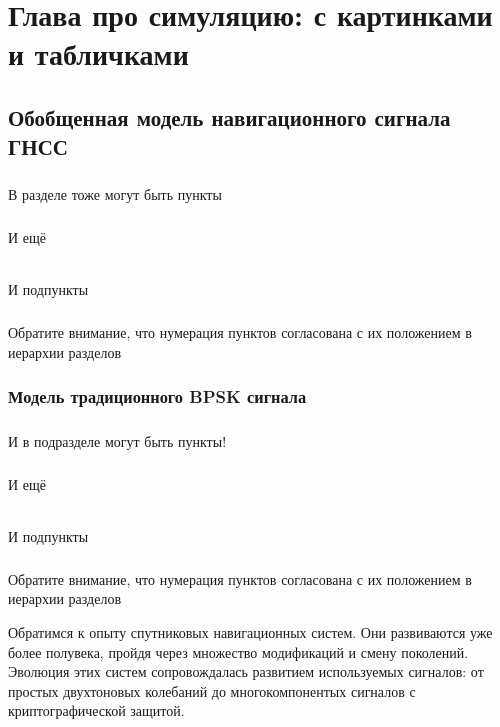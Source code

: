 \chapter{Глава про симуляцию: с картинками и табличками}
\label{cha:simulation}

\section{Обобщенная модель навигационного сигнала ГНСС}

\paragraph{}В разделе тоже могут быть пункты

\paragraph{}И ещё

\subparagraph{}И подпункты

\paragraph{}Обратите внимание, что нумерация пунктов согласована с их положением в иерархии разделов


\subsection{Модель традиционного BPSK сигнала}

\paragraph{}И в подразделе могут быть пункты!

\paragraph{}И ещё

\subparagraph{}И подпункты

\paragraph{}Обратите внимание, что нумерация пунктов согласована с их положением в иерархии разделов

Обратимся к опыту спутниковых навигационных систем. 
Они развиваются уже более полувека, пройдя через множество модификаций и смену поколений. 
Эволюция этих систем сопровождалась развитием используемых сигналов: от простых двухтоновых колебаний до многокомпонентых сигналов с криптографической защитой. 


